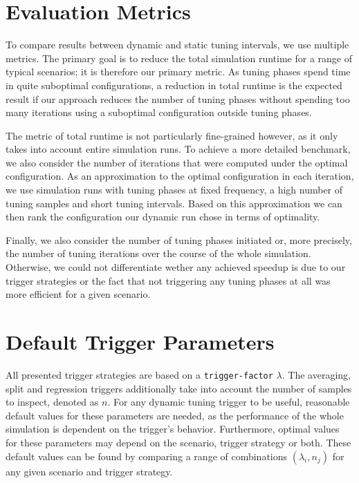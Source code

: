 
\section{Evaluation Metrics}
\label{sec:metrics}
To compare results between dynamic and static tuning intervals, we use multiple metrics.
The primary goal is to reduce the total simulation runtime for a range of typical scenarios; it is therefore our primary metric. As tuning phases spend time in quite suboptimal configurations, a reduction in total runtime is the expected result if our approach reduces the number of tuning phases without spending too many iterations using a suboptimal configuration outside tuning phases.

The metric of total runtime is not particularly fine-grained however, as it only takes into account entire simulation runs. To achieve a more detailed benchmark, we also consider the number of iterations that were computed under the optimal configuration. As an approximation to the optimal configuration in each iteration, we use simulation runs with tuning phases at fixed frequency, a high number of tuning samples and short tuning intervals. Based on this approximation we can then rank the configuration our dynamic run chose in terms of optimality.

Finally, we also consider the number of tuning phases initiated or, more precisely, the number of tuning iterations over the course of the whole simulation. Otherwise, we could not differentiate wether any achieved speedup is due to our trigger strategies or the fact that not triggering any tuning phases at all was more efficient for a given scenario.

\section{Default Trigger Parameters}
\label{sec:default_params}
All presented trigger strategies are based on a \texttt{trigger-factor} $\lambda$. The averaging, split and regression triggers additionally take into account the number of samples to inspect, denoted as $n$. For any dynamic tuning trigger to be useful, reasonable default values for these parameters are needed, as the performance of the whole simulation is dependent on the trigger's behavior.
Furthermore, optimal values for these parameters may depend on the scenario, trigger strategy or both.
These default values can be found by comparing a range of combinations $\left(\lambda_i, n_j\right)$ for any given scenario and trigger strategy.



